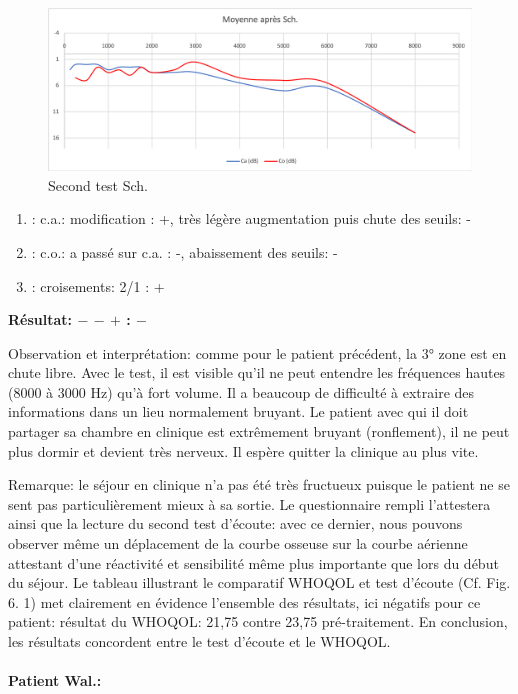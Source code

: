          \begin{figure}[th]
\centering
\includegraphics[width=0.7\linewidth]{images/graphiques/schaff_post.png}
\caption[Patient Sch.: 2° test]{Second test Sch.}

\end{figure}


\begin{enumerate}
	
	\item : c.a.:  modification : +, très légère augmentation puis chute des
	seuils: -
	\item : c.o.: a passé sur c.a. : -, abaissement des seuils:  -
	\item : croisements: 2/1 :     +
\end{enumerate}
\textbf{ Résultat:  $-$    $-$   $+$         :   $-$ }


Observation et interprétation: comme pour le patient précédent, la 3° zone est en chute libre. Avec le 
test, il est visible qu'il ne peut entendre les fréquences hautes (8000 à 3000 Hz) qu'à fort volume.  Il a  
beaucoup de difficulté à extraire des informations dans un 
lieu normalement bruyant. Le patient avec qui il doit partager sa chambre en clinique est extrêmement 
bruyant 
(ronflement), il ne peut plus dormir et devient très nerveux. Il espère quitter la clinique au plus 
vite.


Remarque: le séjour en clinique n'a pas été très fructueux puisque le patient ne se sent pas 
particulièrement mieux à sa sortie. Le questionnaire rempli l'attestera ainsi que la lecture du second test 
d'écoute: avec ce dernier, nous pouvons observer même un déplacement de la courbe osseuse sur la 
courbe aérienne attestant d'une réactivité et sensibilité même plus importante que lors du début du 
séjour. Le tableau illustrant le  comparatif WHOQOL et test d'écoute (Cf. Fig. 6. 1)  met clairement en 
évidence 
l'ensemble des 
résultats, ici négatifs pour ce patient: résultat du WHOQOL: 21,75 contre 23,75 pré-traitement.
En conclusion, les résultats concordent entre le test d'écoute et le WHOQOL.

\paragraph{ Patient Wal.:}

